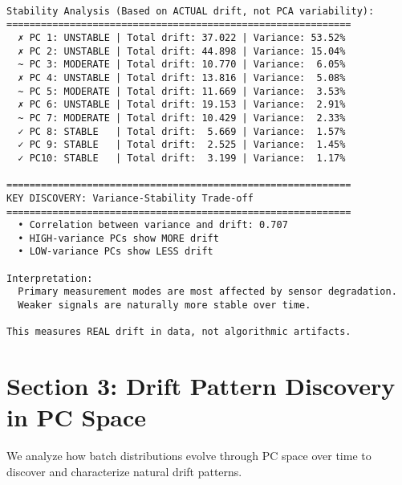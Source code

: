 \documentclass[
  letterpaper,
  DIV=11,
  numbers=noendperiod]{scrartcl}
\begin{document}
\begin{verbatim}

Stability Analysis (Based on ACTUAL drift, not PCA variability):
============================================================
  ✗ PC 1: UNSTABLE | Total drift: 37.022 | Variance: 53.52%
  ✗ PC 2: UNSTABLE | Total drift: 44.898 | Variance: 15.04%
  ~ PC 3: MODERATE | Total drift: 10.770 | Variance:  6.05%
  ✗ PC 4: UNSTABLE | Total drift: 13.816 | Variance:  5.08%
  ~ PC 5: MODERATE | Total drift: 11.669 | Variance:  3.53%
  ✗ PC 6: UNSTABLE | Total drift: 19.153 | Variance:  2.91%
  ~ PC 7: MODERATE | Total drift: 10.429 | Variance:  2.33%
  ✓ PC 8: STABLE   | Total drift:  5.669 | Variance:  1.57%
  ✓ PC 9: STABLE   | Total drift:  2.525 | Variance:  1.45%
  ✓ PC10: STABLE   | Total drift:  3.199 | Variance:  1.17%

============================================================
KEY DISCOVERY: Variance-Stability Trade-off
============================================================
  • Correlation between variance and drift: 0.707
  • HIGH-variance PCs show MORE drift
  • LOW-variance PCs show LESS drift

Interpretation:
  Primary measurement modes are most affected by sensor degradation.
  Weaker signals are naturally more stable over time.

This measures REAL drift in data, not algorithmic artifacts.
\end{verbatim}

\section{Section 3: Drift Pattern Discovery in PC
Space}\label{section-3-drift-pattern-discovery-in-pc-space}

We analyze how batch distributions evolve through PC space over time to
discover and characterize natural drift patterns.
\end{document}
